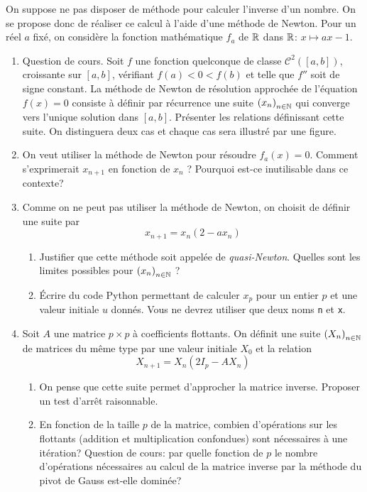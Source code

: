 On suppose ne pas disposer de méthode pour calculer l'inverse d'un nombre. On se propose donc de réaliser ce calcul à l'aide d'une méthode de Newton. Pour un réel $a$ fixé, on considère la fonction mathématique $f_a$ de $\mathbb{R}$ dans $\mathbb{R}$: $x\mapsto ax - 1$.

\begin{enumerate}
  \item Question de cours.\newline
  Soit $f$ une fonction quelconque de classe $\mathcal{C}^2([a,b])$, croissante sur $[a,b]$, vérifiant $f(a)< 0 < f(b)$ et telle que $f''$ soit de signe constant. La méthode de Newton de résolution approchée de l'équation $f(x)=0$ consiste à définir par récurrence une suite  $\left( x_n\right)_{n\in \mathbb{N}}$ qui converge vers l'unique solution dans $[a,b]$.\newline
Présenter les relations définissant cette suite. On distinguera deux cas et chaque cas sera illustré par une figure.
  \item On veut utiliser la méthode de Newton pour résoudre $f_a(x) = 0$.\newline
  Comment s'exprimerait $x_{n+1}$ en fonction de $x_n$ ? Pourquoi est-ce inutilisable dans ce contexte?
  \item Comme on ne peut pas utiliser la méthode de Newton, on choisit de définir une suite par
\begin{displaymath}
  x_{n+1} = x_{n}(2-ax_n)
\end{displaymath}
\begin{enumerate}
  \item Justifier que cette méthode soit appelée de \emph{quasi-Newton}. Quelles sont les limites possibles pour $\left( x_n\right)_{n\in \mathbb{N}}$ ?
  \item \'Ecrire du code Python permettant de calculer $x_p$ pour un entier $p$ et une valeur initiale $u$ donnés. Vous ne devrez utiliser que deux noms \texttt{n} et \texttt{x}.
\end{enumerate}
  \item Soit $A$ une matrice $p\times p$ à coefficients flottants. On définit une suite $\left( X_n\right)_{n\in \mathbb{N}}$ de matrices du même type par une valeur initiale $X_0$ et la relation
\begin{displaymath}
  X_{n+1} = X_n(2I_p -AX_n)
\end{displaymath}
\begin{enumerate}
  \item On pense que cette suite permet d'approcher la matrice inverse. Proposer un test d'arrêt raisonnable.
  \item En fonction de la taille $p$ de la matrice, combien d'opérations sur les flottants (addition et multiplication confondues) sont nécessaires à une itération?\newline
  Question de cours: par quelle fonction de $p$ le nombre d'opérations nécessaires au calcul de la matrice inverse par la méthode du pivot de Gauss est-elle dominée?
\end{enumerate}

\end{enumerate}
